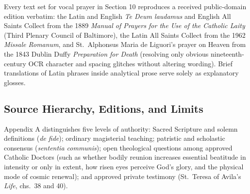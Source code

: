 Every text set for vocal prayer in Section 10 reproduces a received public-domain edition verbatim: the Latin and English \textit{Te Deum laudamus} and English All Saints Collect from the 1889 \textit{Manual of Prayers for the Use of the Catholic Laity} (Third Plenary Council of Baltimore), the Latin All Saints Collect from the 1962 \textit{Missale Romanum}, and St.\ Alphonsus Maria de Liguori's prayer on Heaven from the 1843 Dublin Duffy \textit{Preparation for Death} (resolving only obvious nineteenth-century OCR character and spacing glitches without altering wording). Brief translations of Latin phrases inside analytical prose serve solely as explanatory glosses.

\subsection*{Source Hierarchy, Editions, and Limits}

Appendix A distinguishes five levels of authority: Sacred Scripture and solemn definitions (\textit{de fide}); ordinary magisterial teaching; patristic and scholastic consensus (\textit{sententia communis}); open theological questions among approved Catholic Doctors (such as whether bodily reunion increases essential beatitude in intensity or only in extent, how risen eyes perceive God's glory, and the physical mode of cosmic renewal); and approved private testimony (St.\ Teresa of Avila's \textit{Life}, chs.\ 38 and 40).

